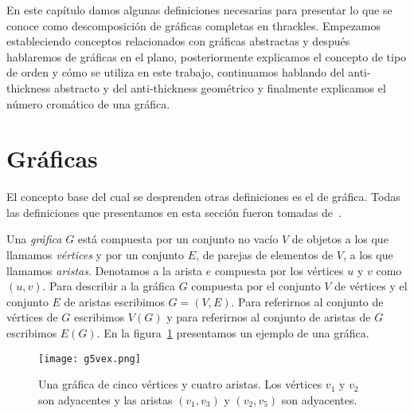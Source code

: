 En este capítulo damos algunas definiciones necesarias para presentar lo que
se conoce como descomposición de gráficas completas en thrackles.
Empezamos estableciendo conceptos relacionados con gráficas abstractas y después
hablaremos de gráficas en el plano, posteriormente explicamos el concepto de tipo de orden y cómo
se utiliza en este trabajo, continuamos hablando del anti-thickness abstracto
y del anti-thickness geométrico y finalmente explicamos el número cromático de una gráfica.

\section{Gráficas}
El concepto base del cual se desprenden otras definiciones es el de gráfica.
Todas las definiciones que presentamos en esta sección fueron tomadas de~\cite{Chartrand2008}.

Una \emph{gráfica} $G$ está compuesta por un conjunto no vacío $V$ de objetos a los que llamamos \emph{vértices}
y por un conjunto $E$, de parejas de elementos de $V$, a los que llamamos \emph{aristas}. Denotamos
a la arista $e$ compuesta por los vértices $u$ y $v$ como $(u,v)$. Para describir a la gráfica $G$
compuesta por el conjunto $V$ de vértices y el conjunto $E$ de aristas escribimos $G=(V,E)$.
Para referirnos al conjunto de vértices de $G$ escribimos $V(G)$ y para referirnos
al conjunto de aristas de $G$ escribimos $E(G)$. En la figura~\ref{fig:g5vex} presentamos
un ejemplo de una gráfica.

\begin{figure}[t]
  \centering
  \texttt{[image: g5vex.png]}
  \caption{Una gráfica de cinco vértices y cuatro aristas. Los vértices $v_1$ y $v_2$
  son adyacentes y las aristas $(v_1,v_3)$ y $(v_2,v_5)$ son adyacentes.}
  \label{fig:g5vex}
\end{figure}

